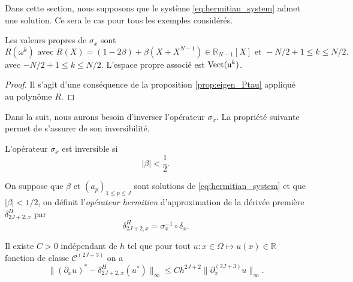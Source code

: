 Dans cette section, nous supposons que le système \eqref{eq:hermitian_system} admet une solution. Ce sera le cas pour tous les exemples considérés.

\begin{proposition}
Les valeurs propres de $\sigma_x$ sont
\begin{equation}
R(\omega^k) \text{ avec } R(X) = (1-2 \beta) + \beta(X+X^{N-1}) \in \mathbb{R}_{N-1}[X] \text{ et } -N/2+1 \leq k \leq N/2.
\end{equation}
avec $-N/2+1 \leq k \leq N/2$. L'espace propre associé est $\text{Vect} ( \mathfrak{u}^k )$.
\end{proposition}

\begin{proof}
Il s'agit d'une conséquence de la proposition \ref{prop:eigen_Ptau} appliqué au polynôme $R$.
\end{proof}
Dans la suit, nous aurons besoin d'inverser l'opérateur $\sigma_x$. La propriété suivante permet de s'assurer de son inversibilité.
\begin{corollaire}
L'opérateur $\sigma_x$ est inversible si
\begin{equation}
| \beta | < \dfrac{1}{2}.
\end{equation}
\end{corollaire}

\begin{definition}
On suppose que $\beta$ et $(a_p)_{1 \leq p \leq J}$ sont solutions de \eqref{eq:hermitian_system} et que $|\beta| < 1/2$, on définit l'\textit{opérateur hermitien} d'approximation de la dérivée première $\delta_{2J+2,x}^H$ par 
\begin{equation}
\delta_{2J+2,x}^H = \sigma_x^{-1} \circ \delta_{x}.
\end{equation}
\label{def:herder}
\end{definition}

\begin{theoreme}
Il existe $C>0$ indépendant de $h$ tel que pour tout $u : x \in \Omega \mapsto u(x) \in \mathbb{R}$ fonction de classe $\mathcal{C}^{(2J+3)}$ on a
\begin{equation}
\| (\partial_x u)^* - \delta_{2J+2,x}^H (u^*) \|_{\infty} \leq C h^{2J+2} \| \partial_x^{(2J+3)} u \|_{\infty}.
\end{equation}
\label{th:consistence_herm2}
\end{theoreme}

